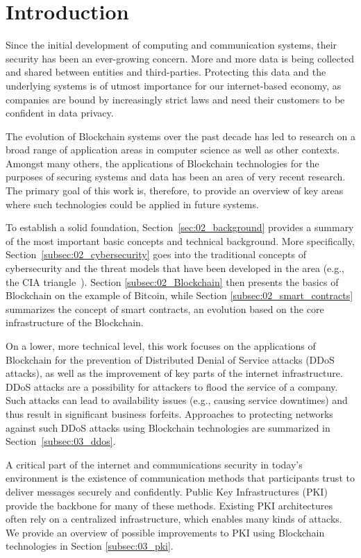 \section{Introduction}

Since the initial development of computing and communication systems, their security has been an ever-growing concern. More and more data is being collected and shared between entities and third-parties. Protecting this data and the underlying systems is of utmost importance for our internet-based economy, as companies are bound by increasingly strict laws and need their customers to be confident in data privacy.

The evolution of Blockchain systems over the past decade has led to research on a broad range of application areas in computer science as well as other contexts. Amongst many others, the applications of Blockchain technologies for the purposes of securing systems and data has been an area of very recent research. The primary goal of this work is, therefore, to provide an overview of key areas where such technologies could be applied in future systems.

To establish a solid foundation, Section~\ref{sec:02_background} provides a summary of the most important basic concepts and technical background. More specifically, Section~\ref{subsec:02_cybersecurity} goes into the traditional concepts of cybersecurity and the threat models that have been developed in the area (e.g., the CIA triangle~\cite{whitman2011principles}). Section \ref{subsec:02_Blockchain} then presents the basics of Blockchain on the example of Bitcoin, while Section \ref{subsec:02_smart_contracts} summarizes the concept of smart contracts, an evolution based on the core infrastructure of the Blockchain.

On a lower, more technical level, this work focuses on the applications of Blockchain for the prevention of Distributed Denial of Service attacks (DDoS attacks), as well as the improvement of key parts of the internet infrastructure. DDoS attacks are a possibility for attackers to flood the service of a company. Such attacks can lead to availability issues (e.g., causing service downtimes) and thus result in significant business forfeits. Approaches to protecting networks against such DDoS attacks using Blockchain technologies are summarized in Section~\ref{subsec:03_ddos}.

A critical part of the internet and communications security in today's environment is the existence of communication methods that participants trust to deliver messages securely and confidently. Public Key Infrastructures (PKI) provide the backbone for many of these methods. Existing PKI architectures often rely on a centralized infrastructure, which enables many kinds of attacks. We provide an overview of possible improvements to PKI using Blockchain technologies in Section \ref{subsec:03_pki}.

